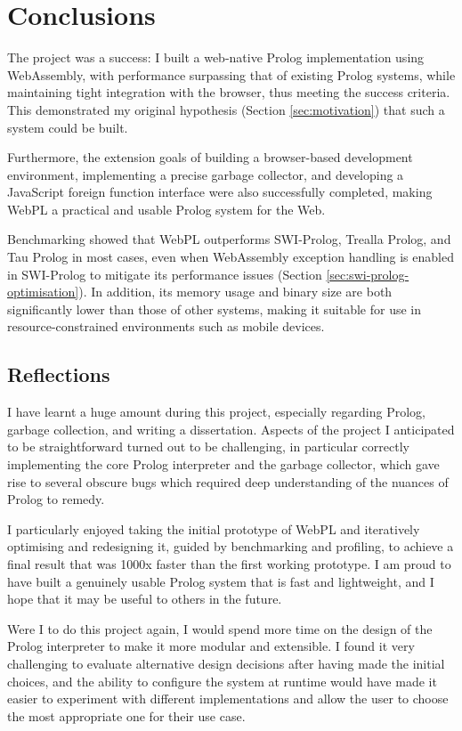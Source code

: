 \chapter{Conclusions}

The project was a success: I built a web-native Prolog implementation using WebAssembly, with performance surpassing that of existing Prolog systems, while maintaining tight integration with the browser, thus meeting the success criteria. This demonstrated my original hypothesis (Section \ref{sec:motivation}) that such a system could be built.

Furthermore, the extension goals of building a browser-based development environment, implementing a precise garbage collector, and developing a JavaScript foreign function interface were also successfully completed, making WebPL a practical and usable Prolog system for the Web.

Benchmarking showed that WebPL outperforms SWI-Prolog, Trealla Prolog, and Tau Prolog in most cases, even when WebAssembly exception handling is enabled in SWI-Prolog to mitigate its performance issues (Section \ref{sec:swi-prolog-optimisation}). In addition, its memory usage and binary size are both significantly lower than those of other systems, making it suitable for use in resource-constrained environments such as mobile devices.

\section{Reflections}

I have learnt a huge amount during this project, especially regarding Prolog, garbage collection, and writing a dissertation. Aspects of the project I anticipated to be straightforward turned out to be challenging, in particular correctly implementing the core Prolog interpreter and the garbage collector, which gave rise to several obscure bugs which required deep understanding of the nuances of Prolog to remedy.

I particularly enjoyed taking the initial prototype of WebPL and iteratively optimising and redesigning it, guided by benchmarking and profiling, to achieve a final result that was 1000x faster than the first working prototype. I am proud to have built a genuinely usable Prolog system that is fast and lightweight, and I hope that it may be useful to others in the future.

Were I to do this project again, I would spend more time on the design of the Prolog interpreter to make it more modular and extensible. I found it very challenging to evaluate alternative design decisions after having made the initial choices, and the ability to configure the system at runtime would have made it easier to experiment with different implementations and allow the user to choose the most appropriate one for their use case.

